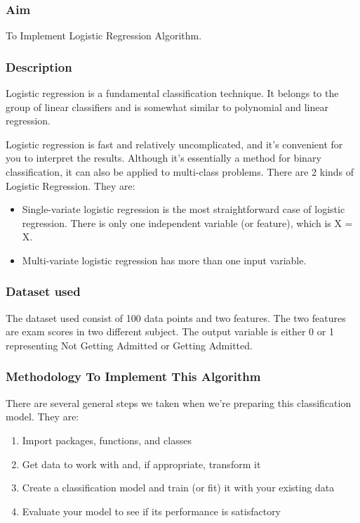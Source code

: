 \documentclass[12pt,a4paper]{article}
\begin{document}
\subsubsection{Aim}
\quad \quad To Implement Logistic Regression Algorithm.


\subsubsection{Description}

\quad \quad Logistic regression is a fundamental classification technique. It belongs to the group of linear classifiers and is somewhat similar to polynomial and linear regression.

\quad Logistic regression is fast and relatively uncomplicated, and it’s convenient for you to interpret the results. Although it’s essentially a method for binary classification, it can also be applied to multi-class problems. There are 2 kinds of Logistic Regression. They are:
\begin{itemize}
    \item Single-variate logistic regression is the most straightforward case of logistic regression. There is only one independent variable (or feature), which is X = X.
    \item Multi-variate logistic regression has more than one input variable.
\end{itemize}

\subsubsection{Dataset used}

\quad \quad The dataset used consist of 100 data points and two features. The two features are exam scores in two different subject. The output variable is either 0 or 1 representing Not Getting Admitted or Getting Admitted.

\subsubsection{Methodology To Implement This Algorithm}

\quad \quad There are several general steps we taken when we’re preparing this classification model. They are: 

\begin{enumerate}
    \item Import packages, functions, and classes 
    \item Get data to work with and, if appropriate, transform it
    \item Create a classification model and train (or fit) it with your existing data 
    \item Evaluate your model to see if its performance is satisfactory 

\end{enumerate}
   
\end{document}
